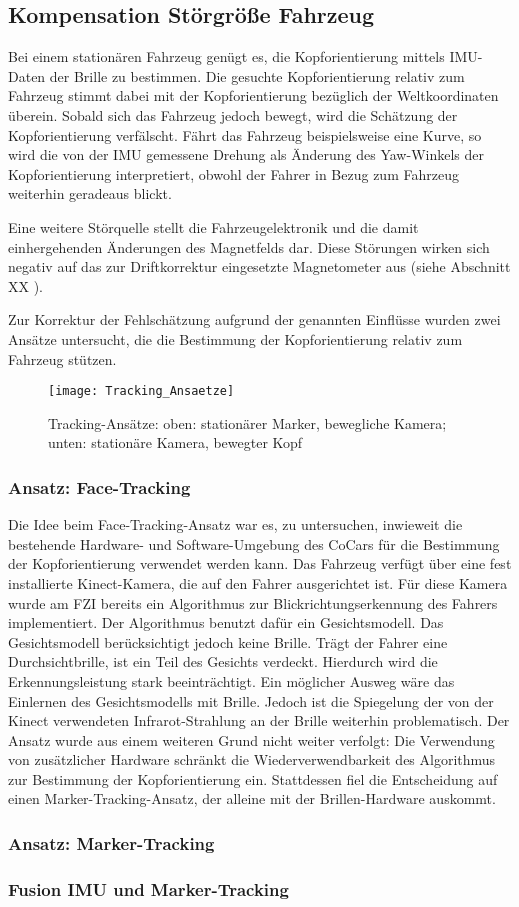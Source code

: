 
\subsection{Kompensation Störgröße Fahrzeug}

Bei einem stationären Fahrzeug genügt es, die Kopforientierung mittels \acs{IMU}-Daten der Brille zu bestimmen. Die gesuchte Kopforientierung relativ zum Fahrzeug stimmt dabei mit der Kopforientierung bezüglich der Weltkoordinaten überein. Sobald sich das Fahrzeug jedoch bewegt, wird die Schätzung der Kopforientierung verfälscht. Fährt das Fahrzeug beispielsweise eine Kurve, so wird die von der IMU gemessene Drehung als Änderung des Yaw-Winkels der Kopforientierung interpretiert, obwohl der Fahrer in Bezug zum Fahrzeug weiterhin geradeaus blickt.

Eine weitere Störquelle stellt die Fahrzeugelektronik und die damit einhergehenden Änderungen des Magnetfelds dar. Diese Störungen wirken sich negativ auf das zur Driftkorrektur eingesetzte Magnetometer aus (siehe Abschnitt XX ).

Zur Korrektur der Fehlschätzung aufgrund der genannten Einflüsse wurden zwei Ansätze untersucht, die die Bestimmung der Kopforientierung relativ zum Fahrzeug stützen.

\begin{figure}[h]
  \centering
  \texttt{[image: Tracking\_Ansaetze]}
  \caption{Tracking-Ansätze: oben: stationärer Marker, bewegliche Kamera; unten: stationäre Kamera, bewegter Kopf}
  \label{fig:tracking_ansaetze}
\end{figure}

\subsubsection{Ansatz: Face-Tracking}
Die Idee beim Face-Tracking-Ansatz war es, zu untersuchen, inwieweit die bestehende Hardware- und Software-Umgebung des CoCars für die Bestimmung der Kopforientierung verwendet werden kann. Das Fahrzeug verfügt über eine fest installierte Kinect-Kamera, die auf den Fahrer ausgerichtet ist. Für diese Kamera wurde am FZI bereits ein Algorithmus zur Blickrichtungserkennung des Fahrers implementiert. Der Algorithmus benutzt dafür ein Gesichtsmodell. Das Gesichtsmodell berücksichtigt jedoch keine Brille. Trägt der Fahrer eine Durchsichtbrille, ist ein Teil des Gesichts verdeckt. Hierdurch wird die Erkennungsleistung stark beeinträchtigt. Ein möglicher Ausweg wäre das Einlernen des Gesichtsmodells mit Brille. Jedoch ist die Spiegelung der von der Kinect verwendeten Infrarot-Strahlung an der Brille weiterhin problematisch. Der Ansatz wurde aus einem weiteren Grund nicht weiter verfolgt: Die Verwendung von zusätzlicher Hardware schränkt die Wiederverwendbarkeit des Algorithmus zur Bestimmung der Kopforientierung ein. Stattdessen fiel die Entscheidung auf einen Marker-Tracking-Ansatz, der alleine mit der Brillen-Hardware auskommt.

\subsubsection{Ansatz: Marker-Tracking}



\subsubsection{Fusion IMU und Marker-Tracking}
